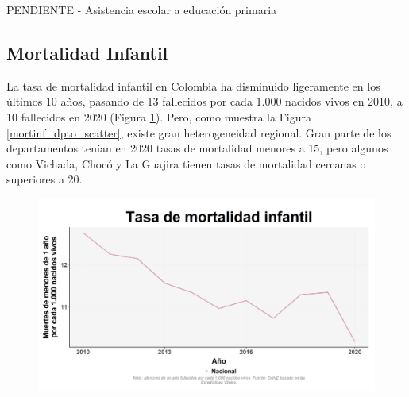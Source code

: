         PENDIENTE - Asistencia escolar a educación primaria

    \subsection{Mortalidad Infantil}

        La tasa de mortalidad infantil en Colombia ha disminuido ligeramente en los últimos 10 años, pasando de 13 fallecidos por cada 1.000 nacidos vivos en 2010, a 10 fallecidos en 2020 (Figura \ref{mortinf_nal_trend}). Pero, como muestra la Figura \ref{mortinf_dpto_scatter}, existe gran heterogeneidad regional. Gran parte de los departamentos tenían en 2020 tasas de mortalidad menores a 15, pero algunos como Vichada, Chocó y La Guajira tienen tasas de mortalidad cercanas o superiores a 20.

    \begin{figure}[H]
        \caption[Tasa de mortalidad infantil a nivel nacional ]{\label{mortinf_nal_trend} }
        \begin{center}
        \includegraphics[width=\textwidth,keepaspectratio]{img/var_291_trend.png}
        \end{center}
    \end{figure}

